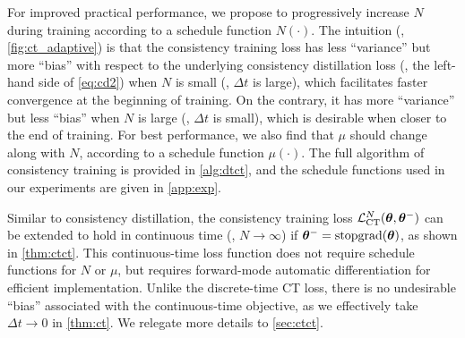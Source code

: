 For improved practical performance, we propose to progressively increase $N$ during training according to a schedule function $N(\cdot)$. The intuition (\cf, \cref{fig:ct_adaptive}) is that the consistency training loss has less ``variance'' but more ``bias'' with respect to the underlying consistency distillation loss (\ie, the left-hand side of \cref{eq:cd2}) when $N$ is small (\ie, $\Delta t$ is large), which facilitates faster convergence at the beginning of training. On the contrary, it has more ``variance'' but less ``bias'' when $N$ is large (\ie, $\Delta t$ is small), which is desirable when closer to the end of training. For best performance, we also find that $\mu$ should change along with $N$, according to a schedule function $\mu(\cdot)$. The full algorithm of consistency training is provided in \cref{alg:dtct}, and the schedule functions used in our experiments are given in \cref{app:exp}.

Similar to consistency distillation, the consistency training loss $\mathcal{L}_\text{CT}^N ({\bm{\theta}}, {\bm{\theta}}^{-})$ can be extended to hold in continuous time (\ie, $N \to \infty$) if ${\bm{\theta}}^{-} = \operatorname{stopgrad}({\bm{\theta}})$, as shown in \cref{thm:ctct}. This continuous-time loss function does not require schedule functions for $N$ or $\mu$, but requires forward-mode automatic differentiation for efficient implementation. %
Unlike the discrete-time CT loss, there is no undesirable ``bias'' associated with the continuous-time objective, as we effectively take $\Delta t \to 0$ in \cref{thm:ct}. We relegate more details to \cref{sec:ctct}.

